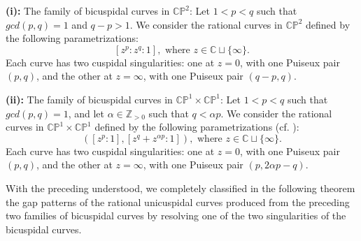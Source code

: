 \documentclass[11pt]{amsart}
\theoremstyle{plain}
\numberwithin{theorem}{section}
\theoremstyle{definition}
\newcommand{\C}{{\mathbb C}}
\newcommand{\Z}{{\mathbb Z}}
\renewcommand{\P}{{\mathbb P}}
\begin{document}
{\bf (i):} The family of bicuspidal curves in $\C\P^2$: Let $1<p<q$ such that $gcd(p,q)=1$ and $q-p>1$.
We consider the rational curves in $\C\P^2$ defined by the following parametrizations:
$$
[z^p: z^q: 1], \mbox{ where $z\in \C\sqcup\{\infty\}$}. 
$$
Each curve has  two cuspidal singularities: one at $z=0$, with one Puiseux pair $(p,q)$, and the other
at $z=\infty$, with one Puiseux pair $(q-p,q)$. 

\vspace{2mm}

{\bf (ii):} The family of bicuspidal curves in $\C\P^1\times \C\P^1$: Let $1<p<q$ such that 
$gcd(p,q)=1$, and let $\alpha\in \Z_{>0}$ such that $q<\alpha p$. We consider the 
rational curves in $\C\P^1\times \C\P^1$ defined by the following parametrizations (cf. \cite{Moe}):
$$
([z^p:1], [z^q+z^{\alpha p} :1]), \mbox{ where $z\in \C\sqcup\{\infty\}$}.
$$
Each curve has two cuspidal singularities: one at $z=0$, with one Puiseux pair $(p,q)$, and the other
at $z=\infty$, with one Puiseux pair $(p,2\alpha p-q)$. 

\vspace{2mm}

With the preceding understood, we completely classified in the following theorem the gap patterns of the rational unicuspidal curves produced from the preceding two families of bicuspidal curves
by resolving one of the two singularities of the bicuspidal curves. 
\end{document}

